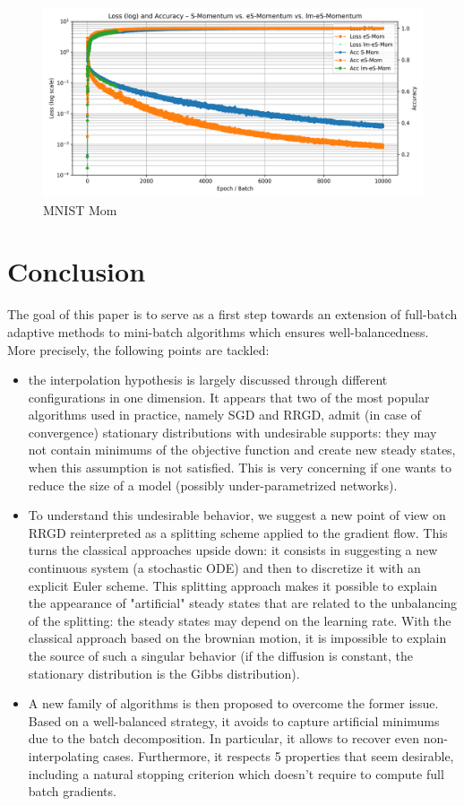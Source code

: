 \documentclass[article,authoryear,jmlmc]{beg_32}             %
\begin{document}
\begin{figure}[!h]
  \includegraphics[width=0.8\linewidth]{chapitre5_img/Mom_comparison_plot_log.png}
  \caption{MNIST Mom}
  \label{mnist_mom}
\end{figure}




\section{Conclusion}
\label{section_conclusion}

The goal of this paper is to serve as a first step towards an extension of full-batch adaptive methods \cite{Bilel} to mini-batch algorithms which ensures well-balancedness.
More precisely, the following points are tackled:
\begin{itemize}
	\item the interpolation hypothesis is largely discussed through different configurations in one dimension. It appears that two of the most popular algorithms used in practice, namely SGD and RRGD, admit (in case of convergence) stationary distributions with undesirable supports: they may not contain minimums of the objective function and create new steady states, when this assumption is not satisfied. This is very concerning if one wants to reduce the size of a model (possibly under-parametrized networks).
	\item To understand this undesirable behavior, we suggest a new point of view on RRGD reinterpreted as a splitting scheme applied to the gradient flow. This turns the
          classical approaches upside down: it consists in suggesting a new continuous system (a stochastic ODE) and then to discretize it with an explicit Euler scheme. This
          splitting approach makes it possible to explain the appearance of "artificial" steady states that are related to the unbalancing of the splitting: the steady states may depend on the learning rate. With the classical approach based on the brownian motion, it is impossible to explain the source of such a singular behavior (if the diffusion is constant, the stationary distribution is the Gibbs distribution).
         \item A new family of algorithms is then proposed to overcome the former issue. Based on a well-balanced strategy, it avoids to capture artificial minimums due to the batch
           decomposition. In particular, it allows to recover even non-interpolating cases. Furthermore, it respects 5 properties that seem desirable, including a natural stopping
           criterion which doesn't require to compute full batch gradients. 
\end{itemize}
\end{document}
